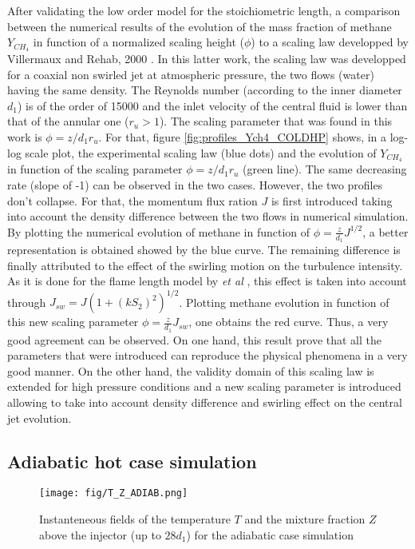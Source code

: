 \documentclass[twocolumn,10pt]{asme2e}
\begin{document}
After validating the low order model for the stoichiometric length, a comparison between the numerical results of the evolution of the mass fraction of methane $Y_{CH_4}$ in function of a normalized scaling height ($\phi$) to a scaling law developped by Villermaux and Rehab, 2000 \cite{villermaux2000mixing}. In this latter work, the scaling law was developped for a coaxial non swirled jet at atmospheric pressure, the two flows (water) having the same density. The Reynolds number (according to the inner diameter $d_1$) is of the order of 15000 and the inlet velocity of the central fluid is lower than that of the annular one ($r_u>1$). The scaling parameter that was found in this work is $\phi= z/d_1 r_u$. For that, figure \ref{fig:profiles_Ych4_COLDHP} shows, in a log-log scale plot, the experimental scaling law (blue dots) and the evolution of $Y_{CH_4}$ in function of the scaling parameter $\phi= z/d_1 r_u$ (green line). The same decreasing rate (slope of -1) can be observed in the two cases. However, the two profiles don't collapse. For that, the momentum flux ration $J$ is first introduced taking into account the density difference between the two flows in numerical simulation. By plotting the numerical evolution of methane in function of $\phi=\frac{z}{d_1} J^{1/2}$, a better representation is obtained showed by the blue curve. The remaining difference is finally attributed to the effect of the swirling motion on the turbulence intensity. As it is done for the flame length model by  \textit{et al} \cite{degeneve2019scaling}, this effect is taken into account through $J_{sw}=J(1+(kS_2)^2)^{1/2}$. Plotting methane evolution in function of this new scaling parameter $\phi=\frac{z}{d_1} J_{sw}$, one obtains the red curve. Thus, a very good agreement can be observed. On one hand, this result prove that all the parameters that were introduced can reproduce the physical phenomena in a very good manner. On the other hand, the validity domain of this scaling law is extended for high pressure conditions and a new scaling parameter is introduced allowing to take into account density difference and swirling effect on the central jet evolution. 


\subsection*{Adiabatic hot case simulation}

\begin{figure}
       \centering
       \texttt{[image: fig/T\_Z\_ADIAB.png]}
      \caption{Instanteneous fields of the temperature $T$ and the mixture fraction $Z$ above the injector (up to $28 d_1$) for the adiabatic case simulation }
   \label{fig:fields_TZ_ADIAB}
   \vspace{-0.05 cm}
\end{figure}
\end{document}
